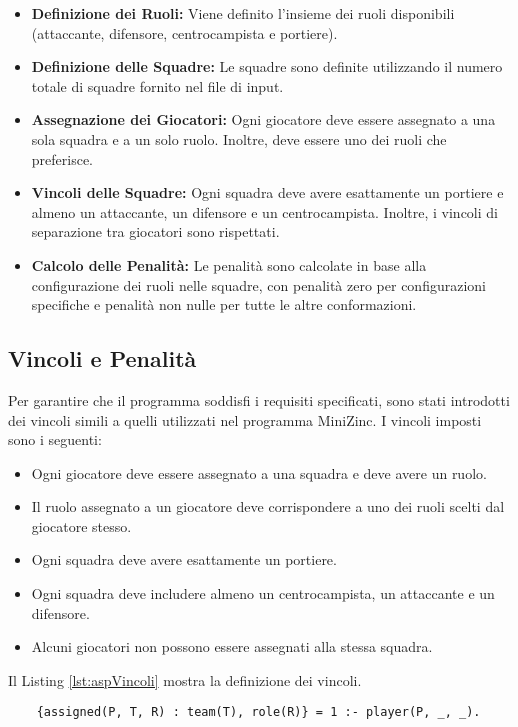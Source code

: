 \documentclass{article}
\begin{document}
\begin{multicols*}{2}
\begin{itemize}
    \item \textbf{Definizione dei Ruoli:} Viene definito l'insieme dei ruoli disponibili (attaccante, difensore, centrocampista e portiere).
    \item \textbf{Definizione delle Squadre:} Le squadre sono definite utilizzando il numero totale di squadre fornito nel file di input.
    \item \textbf{Assegnazione dei Giocatori:} Ogni giocatore deve essere assegnato a una sola squadra e a un solo ruolo. Inoltre, deve essere uno dei ruoli che preferisce.
    \item \textbf{Vincoli delle Squadre:} Ogni squadra deve avere esattamente un portiere e almeno un attaccante, un difensore e un centrocampista. Inoltre, i vincoli di separazione tra giocatori sono rispettati.
    \item \textbf{Calcolo delle Penalità:} Le penalità sono calcolate in base alla configurazione dei ruoli nelle squadre, con penalità zero per configurazioni specifiche e penalità non nulle per tutte le altre conformazioni.
\end{itemize}

\subsection{Vincoli e Penalità}

Per garantire che il programma soddisfi i requisiti specificati, sono stati introdotti dei vincoli simili a quelli utilizzati nel programma MiniZinc. I vincoli imposti sono i seguenti:

\begin{itemize}
    \item Ogni giocatore deve essere assegnato a una squadra e deve avere un ruolo.
    \item Il ruolo assegnato a un giocatore deve corrispondere a uno dei ruoli scelti dal giocatore stesso.
    \item Ogni squadra deve avere esattamente un portiere.
    \item Ogni squadra deve includere almeno un centrocampista, un attaccante e un difensore.
    \item Alcuni giocatori non possono essere assegnati alla stessa squadra.
\end{itemize}
Il Listing \ref{lst:aspVincoli} mostra la definizione dei vincoli.

\begin{lstlisting}[style=minizinc, caption={Vincoli ASP}, label={lst:aspVincoli}]
    % Assegnazione di un giocatore a una squadra e a un ruolo
    {assigned(P, T, R) : team(T), role(R)} = 1 :- player(P, _, _).
    

\end{lstlisting}
\end{multicols*}
\end{document}
